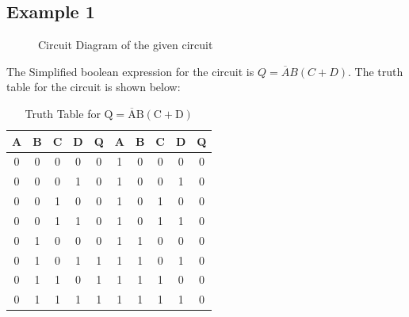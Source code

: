 \documentclass{scrartcl}
\newcommand{\1}{\mathbbm{1}}
\begin{document}
\subsection{Example 1}
\begin{figure}[H]
        \centering
        
        \caption{Circuit Diagram of the given circuit}
\end{figure}
The Simplified boolean expression for the circuit is $Q = \overline{A}B(C+D)$. The truth table for the circuit is shown below:
\begin{table}[H]
    \centering
    \caption{Truth Table for \( \mathrm{Q} = \overline{\mathrm{A}}\mathrm{B}(\mathrm{C + D}) \)}
    \vspace{0.2cm}
    \begin{tabular}{|c|c|c|c||c|||c|c|c|c||c|}
    \hline
    \textbf{A} & \textbf{B} & \textbf{C} & \textbf{D} & \textbf{Q} & \textbf{A} & \textbf{B} & \textbf{C} & \textbf{D} & \textbf{Q}\\
    \hline
    0 & 0 & 0 & 0 & 0 & 1 & 0 & 0 & 0 & 0 \\
    0 & 0 & 0 & 1 & 0 & 1 & 0 & 0 & 1 & 0 \\
    0 & 0 & 1 & 0 & 0 & 1 & 0 & 1 & 0 & 0 \\
    0 & 0 & 1 & 1 & 0 & 1 & 0 & 1 & 1 & 0 \\
    0 & 1 & 0 & 0 & 0 & 1 & 1 & 0 & 0 & 0 \\
    0 & 1 & 0 & 1 & 1 & 1 & 1 & 0 & 1 & 0 \\
    0 & 1 & 1 & 0 & 1 & 1 & 1 & 1 & 0 & 0 \\
    0 & 1 & 1 & 1 & 1 & 1 & 1 & 1 & 1 & 0 \\
    \hline
    \end{tabular}
\end{table}
\end{document}

